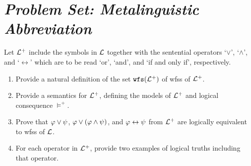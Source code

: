 \documentclass[a4paper, 11pt]{article} %
\begin{document}
\section*{\it Problem Set: Metalinguistic Abbreviation}

Let $\mathcal{L}^+$ include the symbols in $\mathcal{L}$ together with the sentential operators `$\vee$', `$\wedge$', and `$\leftrightarrow$' which are to be read `or', `and', and `if and only if', respectively.
\begin{enumerate}[itemsep=2pt]\small
  \item Provide a natural definition of the set $\texttt{wfs}(\mathcal{L}^+)$ of wfss of $\mathcal{L}^+$.
  \item Provide a semantics for $\mathcal{L}^+$, defining the models of $\mathcal{L}^+$ and logical consequence $\vDash^+$.
  \item Prove that $\varphi \vee \psi$, $\varphi \vee (\varphi \wedge \psi)$, and $\varphi\leftrightarrow \psi$ from $\mathcal{L}^+$ are logically equivalent to wfss of $\mathcal{L}$.
  \item For each operator in $\mathcal{L}^+$, provide two examples of logical truths including that operator.
\end{enumerate}

\end{document}
